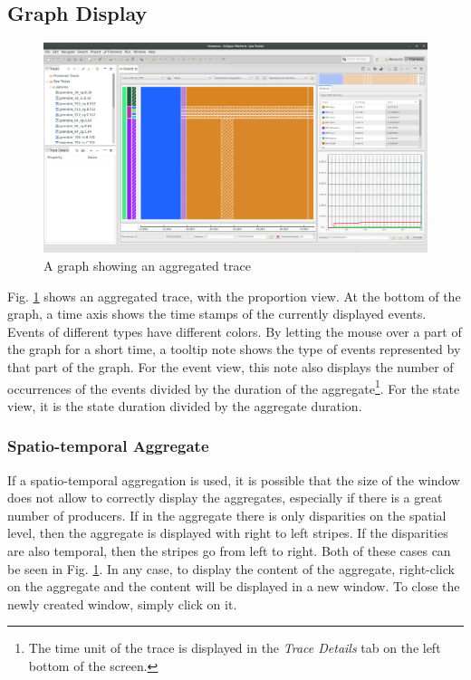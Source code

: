 \documentclass[twoside]{article}
\begin{document}
\begin{sloppypar}
\subsection{Graph Display}
\begin{figure}[h!]
	\centering
	\includegraphics[width=1.0\textwidth]{images/ocelotlAggregated.png}
	\caption{A graph showing an aggregated trace}
	\label{showAggreg}
\end{figure}

Fig. \ref{showAggreg} shows an aggregated trace, with the proportion view. At the bottom of the graph, a time axis shows the time stamps of the currently displayed events. Events of different types have different colors. By letting the mouse over a part of the graph for a short time, a tooltip note shows the type of events represented by that part of the graph. For the event view, this note also displays the number of occurrences of the events divided by the duration of the aggregate\footnote{The time unit of the trace is displayed in the \textit{Trace Details} tab on the left bottom of the screen.}. For the state view, it is the state duration divided by the aggregate duration.

\subsubsection{Spatio-temporal Aggregate}
If a spatio-temporal aggregation is used, it is possible that the size of the window does not allow to correctly display the aggregates, especially if there is a great number of producers. If in the aggregate there is only disparities on the spatial level, then the aggregate is displayed with right to left stripes. If the disparities are also temporal, then the stripes go from left to right. Both of these cases can be seen in Fig. \ref{showAggreg}. In any case, to display the content of the aggregate, right-click on the aggregate and the content will be displayed in a new window. To close the newly created window, simply click on it.


\end{sloppypar}
\end{document}

